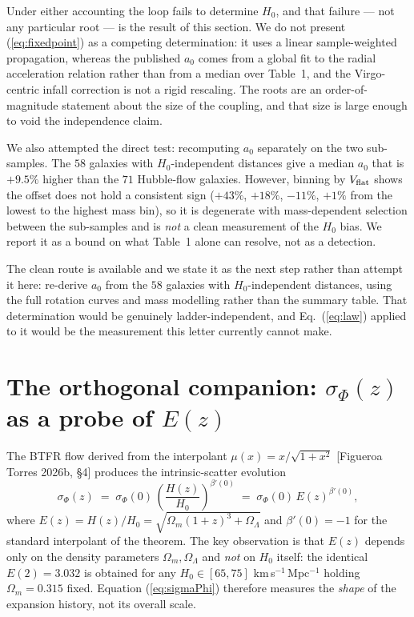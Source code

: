 \documentclass[11pt,a4paper]{article}
\begin{document}
Under either accounting the loop fails to determine $H_0$, and that failure
--- not any particular root --- is the result of this section. We do not
present (\ref{eq:fixedpoint}) as a competing determination: it uses a linear
sample-weighted propagation, whereas the published $a_0$ comes from a global
fit to the radial acceleration relation rather than from a median over
Table~1, and the Virgo-centric infall correction is not a rigid rescaling.
The roots are an order-of-magnitude statement about the size of the
coupling, and that size is large enough to void the independence claim.

We also attempted the direct test: recomputing $a_0$ separately on the two
sub-samples. The $58$ galaxies with $H_0$-independent distances give a median
$a_0$ that is $+9.5\%$ higher than the $71$ Hubble-flow galaxies. However,
binning by $V_{\rm flat}$ shows the offset does not hold a consistent sign
($+43\%$, $+18\%$, $-11\%$, $+1\%$ from the lowest to the highest mass bin),
so it is degenerate with mass-dependent selection between the sub-samples
and is \emph{not} a clean measurement of the $H_0$ bias. We report it as a
bound on what Table~1 alone can resolve, not as a detection.

The clean route is available and we state it as the next step rather than
attempt it here: re-derive $a_0$ from the $58$ galaxies with
$H_0$-independent distances, using the full rotation curves and mass
modelling rather than the summary table. That determination would be
genuinely ladder-independent, and Eq.~(\ref{eq:law}) applied to it would be
the measurement this letter currently cannot make.

\section{The orthogonal companion: $\sigma_\Phi(z)$ as a probe of $E(z)$}

The BTFR flow derived from the interpolant $\mu(x) = x/\sqrt{1+x^2}$
[Figueroa Torres 2026b, \S4] produces the intrinsic-scatter evolution
\begin{equation}
\sigma_\Phi(z) \;=\; \sigma_\Phi(0)\,
\left(\frac{H(z)}{H_0}\right)^{\beta'(0)}
\;=\; \sigma_\Phi(0)\, E(z)^{\beta'(0)},
\label{eq:sigmaPhi}
\end{equation}
where $E(z) = H(z)/H_0 = \sqrt{\Omega_m(1+z)^3 + \Omega_\Lambda}$ and
$\beta'(0) = -1$ for the standard interpolant of the theorem. The
key observation is that $E(z)$ depends only on the density parameters
$\Omega_m, \Omega_\Lambda$ and \emph{not} on $H_0$ itself: the identical
$E(2) = 3.032$ is obtained for any $H_0 \in [65, 75]$ km\,s$^{-1}$\,Mpc$^{-1}$
holding $\Omega_m = 0.315$ fixed. Equation (\ref{eq:sigmaPhi}) therefore
measures the \emph{shape} of the expansion history, not its overall scale.
\end{document}
